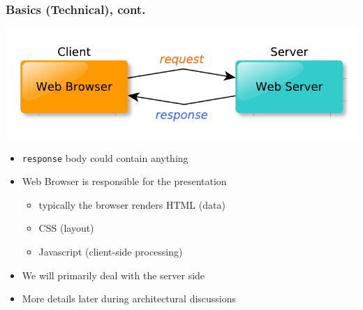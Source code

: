 \documentclass{beamer}
\begin{document}
\begin{frame}\frametitle{Basics (Technical), cont.} 

  \begin{center}
    \includegraphics[scale=0.55]{diagrams/web_client_server.pdf}  
  \end{center}
  
  \begin{itemize}
  
    \item \texttt{response} body could contain anything
    \pause
    
    \item Web Browser is responsible for the presentation
    \begin{itemize}
      \item typically the browser renders HTML (data)
      \item CSS (layout)
      \item Javascript (client-side processing)
    \end{itemize}
    \pause
    
    \item We will primarily deal with the server side
    \pause
    
    \item More details later during architectural discussions

  \end{itemize}
\end{frame}
\end{document}
